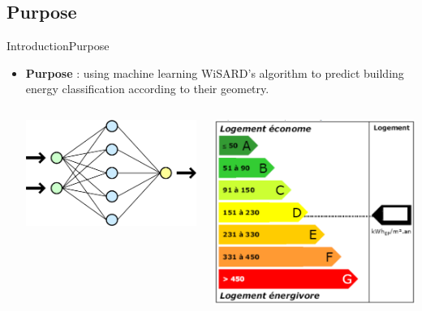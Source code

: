 \documentclass[10pt]{beamer}
\begin{document}
\subsection{Purpose}
\begin{frame}{Introduction}{Purpose}
\begin{itemize}
  \item \textbf{Purpose} : using machine learning WiSARD's algorithm
    to predict building energy classification according to their geometry.

\begin{columns}[T] %
\begin{column}{.48\textwidth}
    \begin{minipage}{0.95\linewidth}
        \medskip\bigskip\medskip
        \includegraphics[scale=0.25]{../figures_trabalho_final/Neuralnetwork.png}
        \medskip
    \end{minipage}
\end{column}%
\begin{column}{.48\textwidth}
    \begin{minipage}{0.95\linewidth}
        \medskip
        \includegraphics[scale=0.25]{../figures_trabalho_final/classification_consomation.png}

\end{minipage}
\end{column}
\end{columns}
\end{itemize}
\end{frame}
\end{document}
